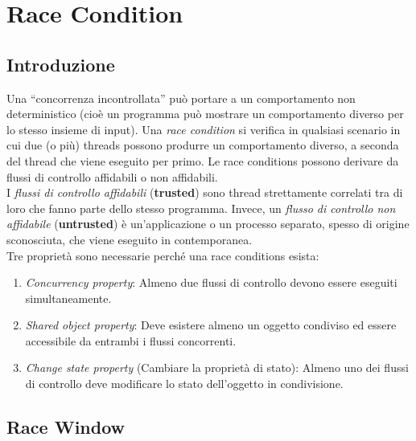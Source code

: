 \chapter{Race Condition}

\section{Introduzione}

Una “concorrenza incontrollata” può portare a un comportamento non deterministico
(cioè un programma può mostrare un comportamento diverso per lo stesso insieme
di input).
Una \textit{race condition} si verifica in qualsiasi scenario in cui due (o più)
threads possono
produrre un comportamento diverso, a seconda del thread che viene eseguito per primo.
Le race conditions possono derivare da flussi di controllo affidabili o non
affidabili.\\
I \textit{flussi di controllo affidabili} (\textbf{trusted}) sono thread
strettamente correlati tra di loro che fanno parte dello stesso programma.
Invece, un \textit{flusso di controllo non affidabile} (\textbf{untrusted})
è un'applicazione o un processo separato, spesso di origine sconosciuta,
che viene eseguito in contemporanea.\\

Tre proprietà sono necessarie perché una race conditions esista:
\begin{enumerate}
    \item \textit{Concurrency property}: Almeno due flussi di controllo
          devono essere eseguiti simultaneamente.
    \item \textit{Shared object property}: Deve esistere almeno un oggetto
          condiviso ed
          essere accessibile da
          entrambi i flussi concorrenti.
    \item \textit{Change state property} (Cambiare la proprietà di stato):
          Almeno uno dei flussi di
          controllo deve modificare lo stato dell'oggetto in condivisione.
\end{enumerate}

\section{Race Window}

